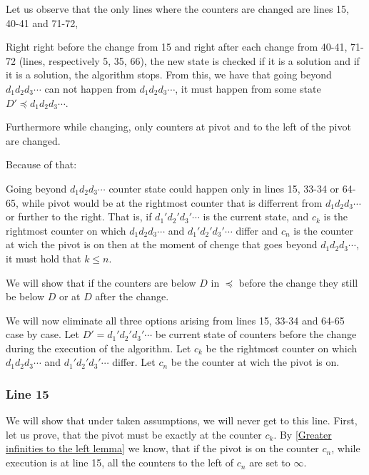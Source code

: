 Let us observe that the only lines where 
the counters are changed are lines 15, 40-41 and 71-72, 

Right right before 
the change from 15 and right after each change from 40-41, 71-72 
(lines, respectively 5, 35, 66), 
the new state is checked if it is a solution and 
if it is a solution, the algorithm stops. From this, we 
have that going beyond $d_1d_2d_3\cdots$ can not happen from $d_1d_2d_3\cdots$, 
it must happen from some state $D' \preceq d_1d_2d_3\cdots$.

Furthermore while changing, 
only counters 
at pivot and to the left of the pivot are changed. 

Because of that:
\begin{observation}\label{position of pointer observation}
Going beyond $d_1d_2d_3\cdots$ counter state 
could happen only in lines 15, 33-34 or 64-65, while pivot would be 
at the rightmost counter that is differrent from $d_1d_2d_3\cdots$ or further to the right. 
That is, if $d_1'd_2'd_3'\cdots$ is the current state, and 
$c_k$ is the rightmost counter on which $d_1d_2d_3\cdots$ 
and $d_1'd_2'd_3'\cdots$ differ and $c_n$ is the counter at wich the pivot is on then 
at the moment of chenge that goes beyond $d_1d_2d_3\cdots$, it must hold that $k \leq n$.
\end{observation}

We will show that if the counters are below $D$ in $\preceq$ before the change they still 
be below $D$ or at $D$ after the change. 

We will now eliminate all three options arising from lines 15, 33-34 and 64-65 case by case. 
Let $D' = d_1'd_2'd_3'\cdots$ be current state of counters before the change 
during the execution of the algorithm. 
Let $c_k$ be the rightmost counter on which $d_1d_2d_3\cdots$ 
and $d_1'd_2'd_3'\cdots$ differ. Let $c_n$ be the counter at wich the pivot is on. 
\subsubsection{Line 15}
We will show that under taken assumptions, we will never get to this line. 
First, let us prove, that the pivot must be exactly at the counter $c_k$. 
By \ref{Greater infinities to the left lemma} we know, that if the pivot is 
on the counter $c_n$, while execution is at line 15, 
all the counters to the left of $c_n$ are set to $\infty$. 

